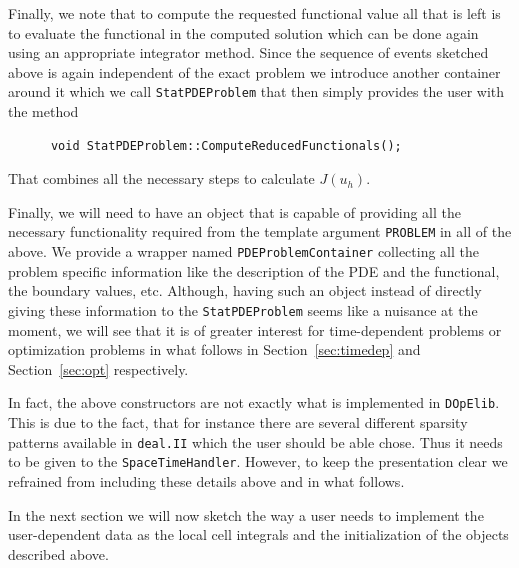 \documentclass[prodmode,acmtoms]{acmsmall}
\numberwithin{equation}{section}
\newcommand{\deal}{\texttt{deal.II}}
\newcommand{\dope}{\texttt{DOpElib}}
\begin{document}
Finally, we note that to compute the requested functional value 
all that is left is to evaluate the functional in the computed solution 
which can be done again using an appropriate integrator method.
Since the sequence of events sketched above is again independent of the 
exact problem we introduce another container around it which we call 
\texttt{StatPDEProblem} that then simply provides the user with the 
method
\begin{lstlisting}
      void StatPDEProblem::ComputeReducedFunctionals();
\end{lstlisting}
That combines all the necessary steps to calculate $J(u_h)$. 

Finally, we will need to have an object that is capable of providing all 
the necessary functionality required from the template argument 
\texttt{PROBLEM} in all of the above. We provide a wrapper named
\texttt{PDEProblemContainer} collecting all the problem specific information 
like the description of the PDE and the functional, the boundary values, etc. 
Although, having such an object instead of directly giving these information
to the \texttt{StatPDEProblem} seems like a nuisance at the moment, we will 
see that it is of greater interest for time-dependent problems or 
optimization problems in what follows in Section~\ref{sec:timedep} and
Section~\ref{sec:opt} respectively. 

\begin{remark}
In fact, the above constructors are not exactly what is implemented in \dope{}.
This is due to the fact, that for instance 
there are several different sparsity patterns available in 
\deal{} which the user should be able chose. Thus it needs to be 
given to the \texttt{SpaceTimeHandler}. However, to keep the 
presentation clear we refrained from including these details above and in
what follows.
\end{remark} 

In the next section we will now sketch the way a user needs to implement the
user-dependent data as the local cell integrals and the initialization of the
objects described above.
\end{document}
